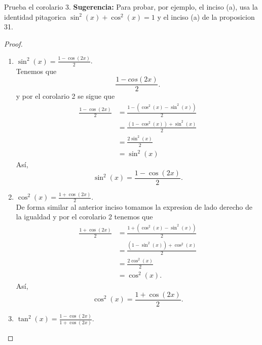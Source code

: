 \documentclass[12pt,a4paper]{article}
\begin{document}
    \begin{mdframed}[style=mdbluebox,frametitle={Ejercicio 2}]
        Prueba el corolario 3. \textbf{Sugerencia:} Para probar, por ejemplo, el inciso (a),
        usa la identidad pitagorica $\sin^{2}(x)+\cos^{2}(x)=1$ y el inciso (a) de la proposicion
        31.
    \end{mdframed}

    \begin{proof}
        \begin{enumerate}
            \item[(a)] $\sin^{2}(x)=\frac{1-\cos(2x)}{2}$.\\
            Tenemos que
            \begin{equation*}
                \frac{1-cos(2x)}{2}.
            \end{equation*}
            y por el corolario 2 se sigue que
            \begin{align*}
                \frac{1-\cos(2x)}{2}&=\frac{1-(\cos^{2}(x)-\sin^{2}(x))}{2}\\
                &=\frac{(1-\cos^{2}(x))+\sin^{2}(x)}{2}\\
                &=\frac{2\sin^{2}(x)}{2}\\
                &=\sin^{2}(x)
            \end{align*}
            Así,
            \begin{equation*}
                \sin^{2}(x)=\frac{1-\cos(2x)}{2}.
            \end{equation*}
            \item[(b)] $\cos^{2}(x)=\frac{1+\cos(2x)}{2}$.\\
            De forma similar al anterior inciso tomamos la expresion de lado derecho de la igualdad
            y por el corolario 2 tenemos que
            \begin{align*}
                \frac{1+\cos(2x)}{2}&=\frac{1+(\cos^{2}(x)-\sin^{2}(x))}{2}\\
                &=\frac{(1-\sin^{2}(x))+\cos^{2}(x)}{2}\\
                &=\frac{2\cos^{2}(x)}{2}\\
                &=\cos^{2}(x).
            \end{align*}
            Así,
            \begin{equation*}
                \cos^{2}(x)=\frac{1+\cos(2x)}{2}.
            \end{equation*}
            \item[(c)] $\tan^{2}(x)=\frac{1-\cos(2x)}{1+\cos(2x)}$.\\

\end{enumerate}
\end{proof}
\end{document}

